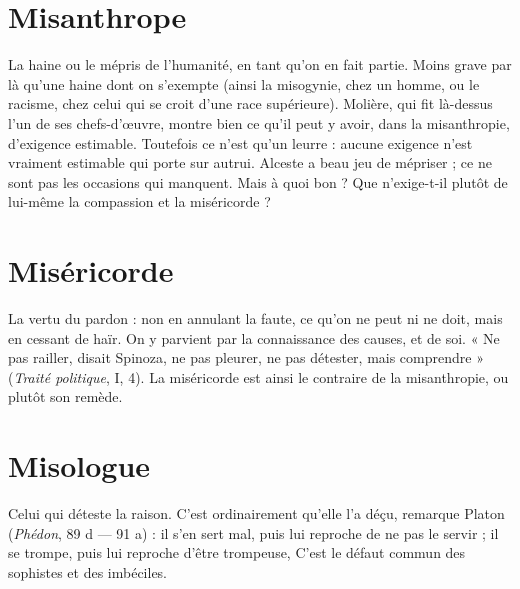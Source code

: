 \section{Misanthrope}
La haine ou le mépris de l'humanité, en tant qu’on en fait
partie. Moins grave par là qu’une haine dont on s’exempte
(ainsi la misogynie, chez un homme, ou le racisme, chez celui qui se croit d’une
race supérieure). Molière, qui fit là-dessus l’un de ses chefs-d’œuvre, montre
bien ce qu’il peut y avoir, dans la misanthropie, d’exigence estimable. Toutefois
ce n'est qu'un leurre : aucune exigence n’est vraiment estimable qui porte sur
autrui. Alceste a beau jeu de mépriser ; ce ne sont pas les occasions qui manquent.
Mais à quoi bon ? Que n’exige-t-il plutôt de lui-même la compassion et
la miséricorde ?

\section{Miséricorde}
La vertu du pardon : non en annulant la faute, ce qu’on ne
peut ni ne doit, mais en cessant de haïr. On y parvient par
la connaissance des causes, et de soi. « Ne pas railler, disait Spinoza, ne pas
pleurer, ne pas détester, mais comprendre » ({\it Traité politique}, I, 4). La miséricorde
est ainsi le contraire de la misanthropie, ou plutôt son remède.

\section{Misologue}
Celui qui déteste la raison. C’est ordinairement qu’elle l’a
déçu, remarque Platon ({\it Phédon}, 89 d — 91 a) : il s’en sert
mal, puis lui reproche de ne pas le servir ; il se trompe, puis lui reproche d’être
trompeuse, C’est le défaut commun des sophistes et des imbéciles.

